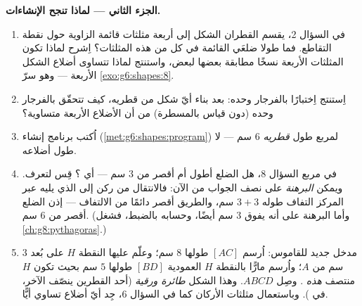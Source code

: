 \begin{problem}
\medskip
\noindent\textbf{الجزء الثاني --- لماذا تنجح الإنشاءات.}
\begin{enumerate}[resume]
  \item في السؤال 2، يقسم القطران الشكل إلى أربعة
        مثلثات قائمة الزاوية حول نقطة التقاطع. فما طولا
        ضلعَي القائمة في كل من هذه المثلثات؟ اِشرح لماذا
        تكون المثلثات الأربعة نسخًا مطابقة بعضها لبعض،
        واستنتج لماذا تتساوى أضلاع الشكل الأربعة --- وهو
        سرّ \cref{exo:g6:shapes:8}.
  \item اِستنتج اِختبارًا بالفرجار وحده: بعد بناء أيّ شكل
        من قطريه، كيف تتحقّق بالفرجار
        وحده (دون قياس بالمسطرة) من أن الأضلاع الأربعة
        متساوية؟
  \item اُكتب برنامج إنشاء
        (\cref{met:g6:shapes:program}) لمربع طول
        \emph{قطريه} $6$ سم --- لا طول أضلاعه.
  \item في مربع السؤال 8، هل الضلع أطول أم
        أقصر من $3$ سم --- أي ؟ قِس
        لتعرف. ويمكن \emph{البرهنة} على نصف الجواب
        من الآن: فالانتقال من ركن إلى الذي يليه عبر
        المركز التفاف طوله $3 + 3$ سم، والطريق 
        أقصر دائمًا من الالتفاف --- إذن الضلع أقصر
        من $6$ سم. (وأما البرهنة على أنه يفوق $3$ سم أيضًا،
        وحسابه بالضبط، فشغل
        \cref{ch:g8:pythagoras}.)
  \item مدخل جديد للقاموس: اُرسم  $[AC]$ طولها
        $8$ سم؛ وعلّم عليها النقطة $H$ على بُعد $3$ سم من $A$؛
        واُرسم مارًّا بالنقطة $H$  العمودية $[BD]$ طولها
        $5$ سم بحيث تكون $H$ منتصف \emph{هذه} . وصِل $ABCD$. وهذا
        الشكل \emph{طائرة ورقية} (أحد القطرين ينصّف
        الآخر، في ). وباستعمال مثلثات الأركان كما
        في السؤال 6، جِد أيّ أضلاع  تساوي
        أيًّا.
\end{enumerate}


\end{problem}

